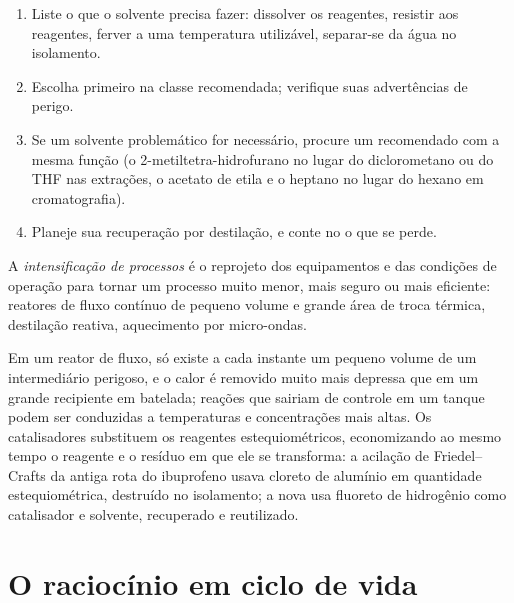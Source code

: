 \begin{method}\label{met:b3:green-industrial:solvent-choice}
\begin{enumerate}
  \item Liste o que o solvente precisa fazer: dissolver os reagentes, resistir aos reagentes,
        ferver a uma temperatura utilizável, separar-se da água no isolamento.
  \item Escolha primeiro na classe recomendada; verifique suas advertências de perigo.
  \item Se um solvente problemático for necessário, procure um recomendado com a mesma
        função (o 2-metiltetra-hidrofurano no lugar do diclorometano ou do THF nas
        extrações, o acetato de etila e o heptano no lugar do hexano em cromatografia).
  \item Planeje sua recuperação por destilação, e conte no  o que se perde.
\end{enumerate}
\end{method}

\begin{definition}\label{def:b3:green-industrial:intensification}
A \emph{intensificação de processos} é o
reprojeto dos equipamentos e das condições de operação para tornar um processo muito menor,
mais seguro ou mais eficiente: reatores de fluxo contínuo de pequeno volume e
grande área de troca térmica, destilação reativa, aquecimento por micro-ondas.
\end{definition}

Em um reator de fluxo, só existe a cada instante um pequeno volume de um intermediário perigoso,
e o calor é removido muito mais depressa que em um grande recipiente em batelada; reações
que sairiam de controle em um tanque podem ser conduzidas a temperaturas e
concentrações mais altas. Os catalisadores substituem os reagentes estequiométricos, economizando ao mesmo tempo o
reagente e o resíduo em que ele se transforma: a acilação de Friedel--Crafts da antiga
rota do ibuprofeno usava cloreto de alumínio em quantidade estequiométrica, destruído no
isolamento; a nova usa fluoreto de hidrogênio como catalisador e solvente,
recuperado e reutilizado.

\section{O raciocínio em ciclo de vida}

